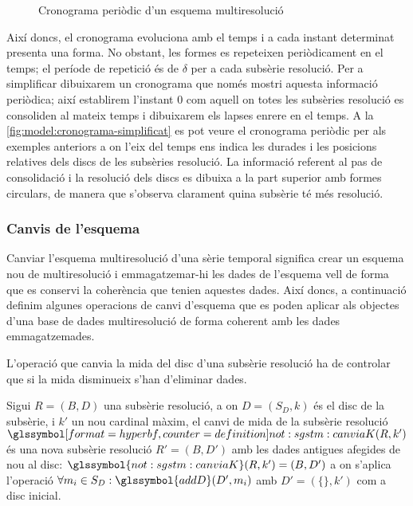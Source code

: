 \begin{figure}[tp]
  \centering
  
  \caption{Cronograma periòdic d'un esquema multiresolució}
  \label{fig:model:cronograma-simplificat}
\end{figure}

Així doncs, el cronograma evoluciona amb el temps i a cada instant
determinat presenta una forma. No obstant, les formes es repeteixen
periòdicament en el temps; el període de repetició és de $\delta$ per
a cada subsèrie resolució. Per a simplificar dibuixarem un cronograma
que només mostri aquesta informació periòdica; així establirem
l'instant 0 com aquell on totes les subsèries resolució es consoliden
al mateix temps i dibuixarem els lapses enrere en el temps. A la
\autoref{fig:model:cronograma-simplificat} es pot veure el cronograma
periòdic per als exemples anteriors a on l'eix del temps ens indica
les durades i les posicions relatives dels discs de les subsèries
resolució. La informació referent al pas de consolidació i la
resolució dels discs es dibuixa a la part superior amb formes
circulars, de manera que s'observa clarament quina subsèrie té més
resolució.



\subsubsection{Canvis de l'esquema}

Canviar l'esquema multiresolució d'una sèrie temporal significa crear
un esquema nou de multiresolució i emmagatzemar-hi les dades de
l'esquema vell de forma que es conservi la coherència que tenien
aquestes dades. Així doncs, a continuació definim algunes operacions
de canvi d'esquema que es poden aplicar als objectes d'una base de
dades multiresolució de forma coherent amb les dades emmagatzemades.


L'operació que canvia la mida del disc d'una subsèrie resolució ha de
controlar que si la mida disminueix s'han d'eliminar dades.
\begin{definition}
  Sigui $R=(B,D)$ una subsèrie resolució, a on $D=(S_D,k)$ és el disc
  de la subsèrie, i $k'$ un nou cardinal màxim, el canvi de mida de la
  subsèrie resolució $\glssymboldef{not:sgstm:canviaK}(R,k')$ és una
  nova subsèrie resolució $R'=(B,D')$ amb les dades antigues afegides
  de nou al disc: $\glssymbol{not:sgstm:canviaK}(R,k')= (B,D')$ a on
  s'aplica l'operació $\forall m_i \in S_D: \glssymbol{addD}(D',m_i)$
  amb $D'=(\{\},k')$ com a disc inicial.
\end{definition}


